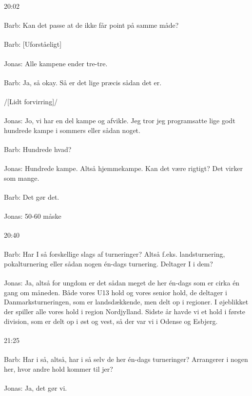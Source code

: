 20:02
\\\\
Barb: Kan det passe at de ikke får point på samme måde?
\\\\
Barb: [Uforståeligt]
\\\\
Jonas: Alle kampene ender tre-tre.
\\\\
Barb: Ja, så okay. Så er det lige præcis sådan det er.
\\\\
/[Lidt forvirring]/
\\\\
Jonas: Jo, vi har en del kampe og afvikle. Jeg tror jeg programsatte lige godt hundrede kampe i sommers eller sådan noget.
\\\\
Barb: Hundrede hvad?
\\\\
Jonas: Hundrede kampe. Altså hjemmekampe. Kan det være rigtigt? Det virker som mange. 
\\\\
Barb: Det gør det.
\\\\
Jonas: 50-60 måske
\\\\
20:40
\\\\
Barb: Har I så forskellige slags af turneringer? Altså f.eks. landsturnering, pokalturnering eller sådan nogen én-dags turnering. Deltager I i dem?
\\\\
Jonas: Ja, altså for ungdom er det sådan meget de her én-dags som er cirka én gang om måneden. Både vores U13 hold og vores senior hold, de deltager i Danmarksturneringen, som er landsdækkende, men delt op i regioner. I øjeblikket der spiller alle vores hold i region Nordjylland. Sidste år havde vi et hold i første division, som er delt op i øst og vest, så der var vi i Odense og Esbjerg. 
\\\\
21:25
\\\\
Barb: Har i så, altså, har i så selv de her én-dags turneringer? Arrangerer i nogen her, hvor andre hold kommer til jer?
\\\\
Jonas: Ja, det gør vi.
\\\\
